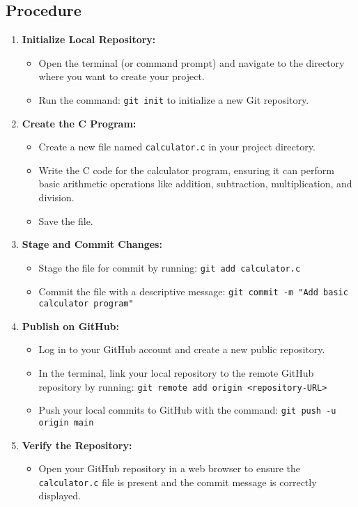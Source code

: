 \documentclass[a4paper,12pt]{article}
\begin{document}
\subsection*{Procedure}
\begin{enumerate}[label=\arabic*.]
    \item \textbf{Initialize Local Repository:}
    \begin{itemize}
        \item Open the terminal (or command prompt) and navigate to the directory where you want to create your project.
        \item Run the command: \texttt{git init} to initialize a new Git repository.
    \end{itemize}
    \item \textbf{Create the C Program:}
    \begin{itemize}
        \item Create a new file named \texttt{calculator.c} in your project directory.
        \item Write the C code for the calculator program, ensuring it can perform basic arithmetic operations like addition, subtraction, multiplication, and division.
        \item Save the file.
    \end{itemize}
    \item \textbf{Stage and Commit Changes:}
    \begin{itemize}
        \item Stage the file for commit by running: \texttt{git add calculator.c}
        \item Commit the file with a descriptive message: \texttt{git commit -m "Add basic calculator program"}
    \end{itemize}
    \item \textbf{Publish on GitHub:}
    \begin{itemize}
        \item Log in to your GitHub account and create a new public repository.
        \item In the terminal, link your local repository to the remote GitHub repository by running: \texttt{git remote add origin <repository-URL>}
        \item Push your local commits to GitHub with the command: \texttt{git push -u origin main}
    \end{itemize}
    \item \textbf{Verify the Repository:}
    \begin{itemize}
        \item Open your GitHub repository in a web browser to ensure the \texttt{calculator.c} file is present and the commit message is correctly displayed.
    \end{itemize}
\end{enumerate}
\end{document}
